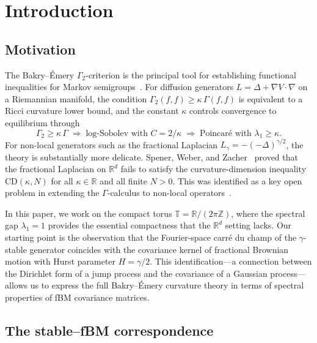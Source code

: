 \documentclass[11pt,a4paper]{article}
\theoremstyle{plain}
\theoremstyle{definition}
\theoremstyle{remark}
\newcommand{\R}{\mathbb{R}}
\newcommand{\Z}{\mathbb{Z}}
\newcommand{\T}{\mathbb{T}}
\begin{document}
\section{Introduction}\label{sec:intro}

\subsection{Motivation}

The Bakry--\'Emery $\Gamma_2$-criterion is the principal tool for
establishing functional inequalities for Markov
semigroups~\cite{BakryGentilLedoux2014}. For diffusion generators
$L = \Delta + \nabla V \cdot \nabla$ on a Riemannian manifold,
the condition $\Gamma_2(f,f) \geq \kappa\,\Gamma(f,f)$ is equivalent
to a Ricci curvature lower bound, and the constant $\kappa$ controls
convergence to equilibrium through
\[
  \Gamma_2 \geq \kappa\,\Gamma
  \;\Longrightarrow\;
  \text{log-Sobolev with } C = 2/\kappa
  \;\Longrightarrow\;
  \text{Poincar\'e with } \lambda_1 \geq \kappa.
\]
For non-local generators such as the fractional Laplacian
$L_\gamma = -(-\Delta)^{\gamma/2}$, the theory is substantially
more delicate. Spener, Weber, and
Zacher~\cite{SpenerWeberZacher2020} proved that the fractional
Laplacian on $\R^d$ fails to satisfy the curvature-dimension inequality
$\mathrm{CD}(\kappa,N)$ for all $\kappa \in \R$ and all finite $N > 0$.
This was identified as a key open problem in extending the $\Gamma$-calculus
to non-local operators~\cite{Garofalo2019}.

In this paper, we work on the compact torus $\T = \R/(2\pi\Z)$, where
the spectral gap $\lambda_1 = 1$ provides the essential compactness that
the $\R^d$ setting lacks.  Our starting point is the observation that
the Fourier-space carr\'e du champ of the $\gamma$-stable generator
coincides with the covariance kernel of fractional Brownian motion
with Hurst parameter $H = \gamma/2$.
This identification---a connection between the Dirichlet form of a
jump process and the covariance of a Gaussian process---allows us to
express the full Bakry--\'Emery curvature theory in terms of spectral
properties of fBM covariance matrices.


\subsection{The stable--fBM correspondence}
\end{document}
